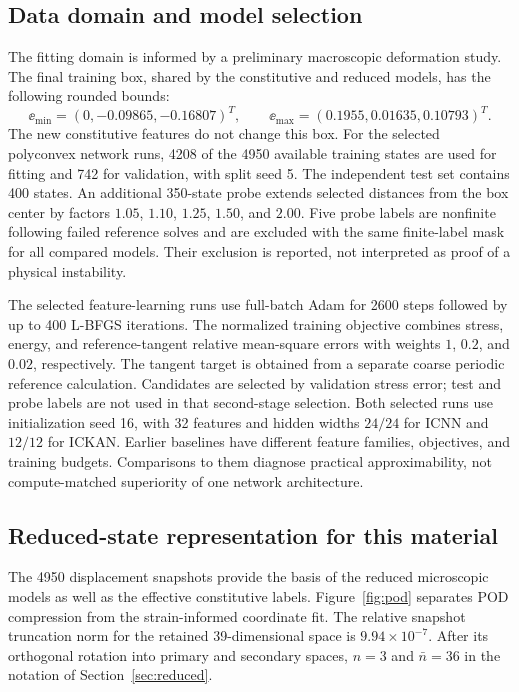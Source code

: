 \subsection{Data domain and model selection}
The fitting domain is informed by a preliminary macroscopic deformation study. The final training box, shared by the constitutive and reduced models, has the following rounded bounds:
\begin{equation}
 \ee_{\min}=(0,-0.09865,-0.16807)^T,\qquad
 \ee_{\max}=(0.1955,0.01635,0.10793)^T.
 \label{eq:box}
\end{equation}
The new constitutive features do not change this box. For the selected polyconvex network runs, 4208 of the 4950 available training states are used for fitting and 742 for validation, with split seed 5. The independent test set contains 400 states. An additional 350-state probe extends selected distances from the box center by factors $1.05$, $1.10$, $1.25$, $1.50$, and $2.00$. Five probe labels are nonfinite following failed reference solves and are excluded with the same finite-label mask for all compared models. Their exclusion is reported, not interpreted as proof of a physical instability.

The selected feature-learning runs use full-batch Adam for 2600 steps followed by up to 400 L-BFGS iterations. The normalized training objective combines stress, energy, and reference-tangent relative mean-square errors with weights $1$, $0.2$, and $0.02$, respectively. The tangent target is obtained from a separate coarse periodic reference calculation. Candidates are selected by validation stress error; test and probe labels are not used in that second-stage selection. Both selected runs use initialization seed 16, with 32 features and hidden widths $24/24$ for ICNN and $12/12$ for ICKAN. Earlier baselines have different feature families, objectives, and training budgets. Comparisons to them diagnose practical approximability, not compute-matched superiority of one network architecture.

\subsection{Reduced-state representation for this material}
The 4950 displacement snapshots provide the basis of the reduced microscopic models as well as the effective constitutive labels. Figure~\ref{fig:pod} separates POD compression from the strain-informed coordinate fit. The relative snapshot truncation norm for the retained 39-dimensional space is $9.94\times10^{-7}$. After its orthogonal rotation into primary and secondary spaces, $n=3$ and $\bar n=36$ in the notation of Section~\ref{sec:reduced}.

